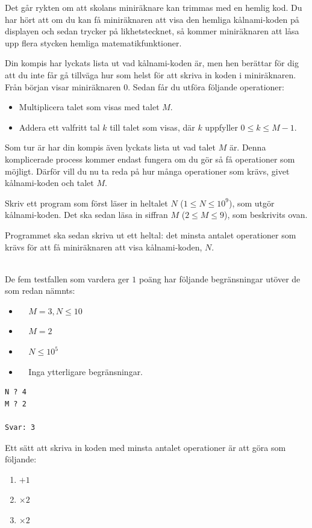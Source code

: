 \newpage
{}

Det går rykten om att skolans miniräknare kan trimmas med en hemlig kod.
Du har hört att om du kan få miniräknaren att visa den hemliga kålnami-koden på displayen och sedan
trycker på likhetstecknet, så kommer miniräknaren att låsa upp flera
stycken hemliga matematikfunktioner.

Din kompis har lyckats lista ut vad kålnami-koden är, men hen berättar för dig
att du inte får gå tillväga hur som helst för att skriva in koden i miniräknaren.
Från början visar miniräknaren $0$. Sedan får du utföra följande operationer:
\begin{itemize}
  \item Multiplicera talet som visas med talet $M$.
  \item Addera ett valfritt tal $k$ till talet som visas, där $k$ uppfyller $0 \leq k \leq M-1$.
\end{itemize}

Som tur är har din kompis även lyckats lista ut vad talet $M$ är. 
Denna komplicerade process kommer endast fungera om du gör så få operationer
som möjligt. Därför vill du nu ta reda på hur många operationer som krävs,
givet kålnami-koden och talet $M$.

Skriv ett program som först läser in heltalet $N$ ($1 \le N \le 10^9$), som utgör kålnami-koden.
Det ska sedan läsa in siffran $M$ ($2 \leq M \leq 9$), som beskrivits ovan.

Programmet ska sedan skriva ut ett heltal: det minsta antalet operationer som krävs för att få miniräknaren att visa
kålnami-koden, $N$.

\\
De fem testfallen som vardera ger $1$ poäng har följande begränsningar utöver de som redan nämnts:
\begin{itemize}
    \item[(1)] $\;\;\;\;M=3, N \leq 10$ 
    \item[(2)] $\;\;\;\;M=2$ 
    \item[(3)] $\;\;\;\;N \leq 10^5$
    \item[(4-5)] $\;\;\;\; $Inga ytterligare begränsningar.
\end{itemize}


\begin{verbatim}
N ? 4
M ? 2

Svar: 3
\end{verbatim}

Ett sätt att skriva in koden med minsta antalet operationer är att göra som följande:
\begin{enumerate}
  \item $+1$
  \item $\times 2$
  \item $\times 2$
\end{enumerate}


